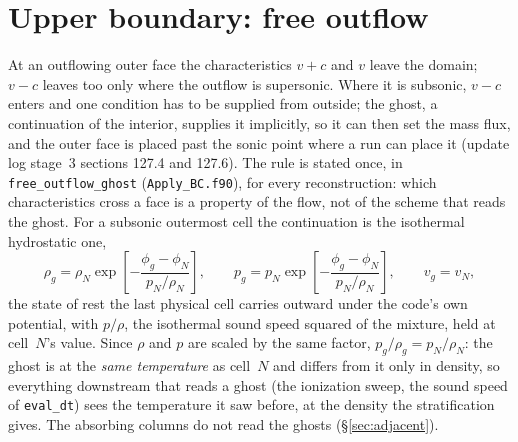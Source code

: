 \documentclass[english,a4paper]{my_memo}
\begin{document}
\section{Upper boundary: free outflow}
\label{sec:upper}

At an outflowing outer face the characteristics $v+c$ and $v$ leave the
domain; $v-c$ leaves too only where the outflow is supersonic. Where it is
subsonic, $v-c$ enters and one condition has to be supplied from outside;
the ghost, a continuation of the interior, supplies it implicitly, so it can
then set the mass flux, and the outer face is placed past the sonic point
where a run can place it (update log stage~3 sections 127.4 and 127.6). The
rule is stated once, in \texttt{free\_outflow\_ghost}
(\texttt{Apply\_BC.f90}), for every reconstruction: which characteristics
cross a face is a property of the flow, not of the scheme that reads the
ghost. For a subsonic outermost cell the continuation is the isothermal
hydrostatic one,
\begin{equation}
\rho_g = \rho_N \exp\!\left[-\frac{\phi_g - \phi_N}{p_N/\rho_N}\right],
\qquad
p_g = p_N \exp\!\left[-\frac{\phi_g - \phi_N}{p_N/\rho_N}\right],
\qquad
v_g = v_N ,
\end{equation}
the state of rest the last physical cell carries outward under the code's
own potential, with $p/\rho$, the isothermal sound speed squared of the
mixture, held at cell~$N$'s value. Since $\rho$ and $p$ are scaled by the
same factor, $p_g/\rho_g = p_N/\rho_N$: the ghost is at the \emph{same
temperature} as cell~$N$ and differs from it only in density, so everything
downstream that reads a ghost (the ionization sweep, the sound speed of
\texttt{eval\_dt}) sees the temperature it saw before, at the density the
stratification gives. The absorbing columns do not read the ghosts
(\S\ref{sec:adjacent}).
\end{document}
